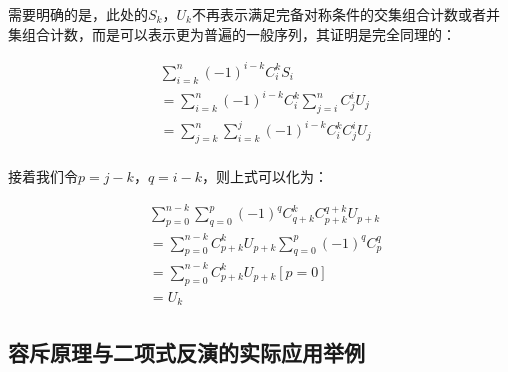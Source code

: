 \documentclass[UTF8]{book}
\begin{document}
需要明确的是，此处的$S_k$，$U_k$不再表示满足完备对称条件的交集组合计数或者并集组合计数，而是可以表示更为普遍的一般序列，其证明是完全同理的：
\begin{large}
    \begin{equation}
        \begin{aligned}
            &\sum_{i=k}^n (-1)^{i-k} C_i^k S_i \\
            &= \sum_{i=k}^n (-1)^{i-k} C_i^k \sum_{j=i}^n C_j^i U_j \\
            &= \sum_{j=k}^n\sum_{i=k}^j (-1)^{i-k} C_i^k C_j^i U_j \\
            \nonumber
        \end{aligned}
    \end{equation}
\end{large}
接着我们令$p=j-k$，$q=i-k$，则上式可以化为：
\begin{large}
    \begin{equation}
        \begin{aligned}
            &\sum_{p=0}^{n-k}\sum_{q=0}^{p} (-1)^q C_{q+k}^k C_{p+k}^{q+k} U_{p+k} \\
            &=\sum_{p=0}^{n-k} C_{p+k}^k U_{p+k} \sum_{q=0}^{p} (-1)^q C_p^q \\
            &=\sum_{p=0}^{n-k} C_{p+k}^k U_{p+k} \left [ p=0 \right ] \\
            &= U_k
            \nonumber
        \end{aligned}
    \end{equation}
\end{large}

\subsection{容斥原理与二项式反演的实际应用举例}
\end{document}
